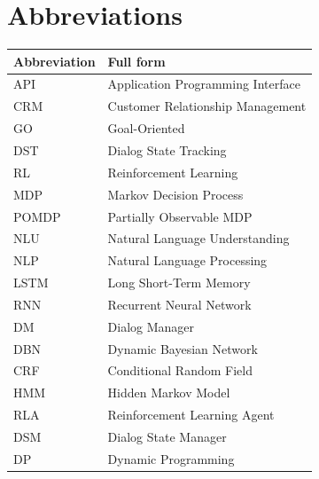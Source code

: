 \documentclass[12pt]{extarticle}
\numberwithin{equation}{section}
\begin{document}
	\clearpage
	\section{Abbreviations}

\begin{table}[H]

	\label{my-label}
	\begin{tabular}{ll}
		\hline
		\multicolumn{1}{|l|}{Abbreviation} & \multicolumn{1}{l|}{Full form}    \\ \hline
		API                                & Application Programming Interface \\
		CRM                                & Customer Relationship Management  \\
		GO                                 & Goal-Oriented                     \\
		DST                                & Dialog State Tracking             \\
		RL                                 & Reinforcement Learning            \\
		MDP                                & Markov Decision Process           \\
		POMDP                              & Partially Observable MDP          \\
		NLU                                & Natural Language Understanding    \\
		NLP                                & Natural Language Processing       \\
		LSTM                               & Long Short-Term Memory            \\
		RNN                                & Recurrent Neural Network          \\
		DM                                 & Dialog Manager                    \\
		DBN                                & Dynamic Bayesian Network          \\
		CRF                                & Conditional Random Field          \\
		HMM                                & Hidden Markov Model               \\
		RLA                                & Reinforcement Learning Agent      \\
		DSM                                & Dialog State Manager              \\
		DP                                 & Dynamic Programming               \\

\end{tabular}
\end{table}
\end{document}
